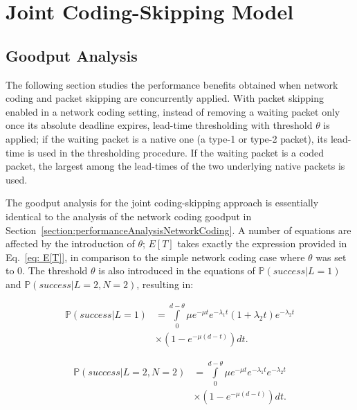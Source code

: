 \documentclass[preprint,12pt]{elsarticle}
\theoremstyle{definition}
\theoremstyle{plain}
\theoremstyle{remark}
\renewcommand{\P}{\ensuremath{\mathbb{P}}}
\newcommand{\e}{e}
\begin{document}
\section{Joint Coding-Skipping Model} \label{section:joint}

\subsection{Goodput Analysis} \label{section:analysis-network-joint}

The following section studies the performance benefits obtained when network coding and packet skipping are concurrently applied. With packet skipping enabled in a network coding setting, instead of removing a waiting packet only once its absolute deadline expires, lead-time thresholding with threshold $\theta$ is applied; if the waiting packet is a native one (a type-1 or type-2 packet), its lead-time is used in the thresholding procedure. If the waiting packet is a coded packet, the largest among the lead-times of the two underlying native packets is used.

The goodput analysis for the joint coding-skipping approach is essentially identical to the analysis of the network coding goodput in Section~\ref{section:performanceAnalysisNetworkCoding}. A number of equations are affected by the introduction of $\theta$; $E[T]$ takes exactly the expression provided in Eq.~\eqref{eq: E[T]}, in comparison to the simple network coding case where $\theta$ was set to 0. The threshold $\theta$ is also introduced in the equations of $\P(success|L = 1)$ and $\P(success| L = 2, N = 2)$, resulting in:

\begin{equation}\label{eq:PsuccessL1New}
\begin{split}
\P(success|L = 1) &= \int\limits_{0}^{d-\theta}  \mu\e^{-\mu t} \e^{-\lambda_{1} t} (1+\lambda_{2}t)\e^{-\lambda_{2} t}   \\ &\times(1-\e^{-\mu(d-t)})dt.
\end{split}
\end{equation}

\begin{equation}\label{eq:PsuccessL2N2New}
\begin{split}
    \P(success| L = 2, N = 2) &= \int\limits_{0}^{d-\theta}  \mu\e^{-\mu t} \e^{-\lambda_{1} t} \e^{-\lambda_{2} t} \\
     & \times (1-\e^{-\mu(d-t)})dt.
\end{split}
  \end{equation}
\end{document}
